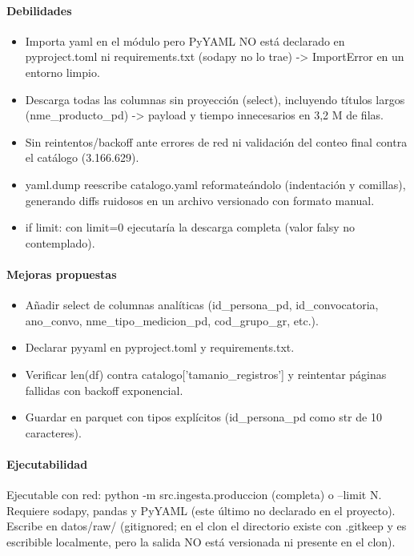 \paragraph{Debilidades}
\begin{itemize}
  \item Importa yaml en el módulo pero PyYAML NO está declarado en pyproject.toml ni requirements.txt (sodapy no lo trae) -> ImportError en un entorno limpio.
  \item Descarga todas las columnas sin proyección (select), incluyendo títulos largos (nme\_producto\_pd) -> payload y tiempo innecesarios en 3,2 M de filas.
  \item Sin reintentos/backoff ante errores de red ni validación del conteo final contra el catálogo (3.166.629).
  \item yaml.dump reescribe catalogo.yaml reformateándolo (indentación y comillas), generando diffs ruidosos en un archivo versionado con formato manual.
  \item if limit: con limit=0 ejecutaría la descarga completa (valor falsy no contemplado).
\end{itemize}

\paragraph{Mejoras propuestas}
\begin{itemize}
  \item Añadir select de columnas analíticas (id\_persona\_pd, id\_convocatoria, ano\_convo, nme\_tipo\_medicion\_pd, cod\_grupo\_gr, etc.).
  \item Declarar pyyaml en pyproject.toml y requirements.txt.
  \item Verificar len(df) contra catalogo['tamanio\_registros'] y reintentar páginas fallidas con backoff exponencial.
  \item Guardar en parquet con tipos explícitos (id\_persona\_pd como str de 10 caracteres).
\end{itemize}

\paragraph{Ejecutabilidad}
Ejecutable con red: python -m src.ingesta.produccion (completa) o --limit N. Requiere sodapy, pandas y PyYAML (este último no declarado en el proyecto). Escribe en datos/raw/ (gitignored; en el clon el directorio existe con .gitkeep y es escribible localmente, pero la salida NO está versionada ni presente en el clon).

